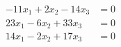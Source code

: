 \begin{align*}
-11x_1 + 2x_2 - 14x_3 &= 0\\
 23x_1  - 6x_2 + 33x_3 &= 0\\
 14x_1  - 2x_2 + 17x_3 &= 0
\end{align*}
